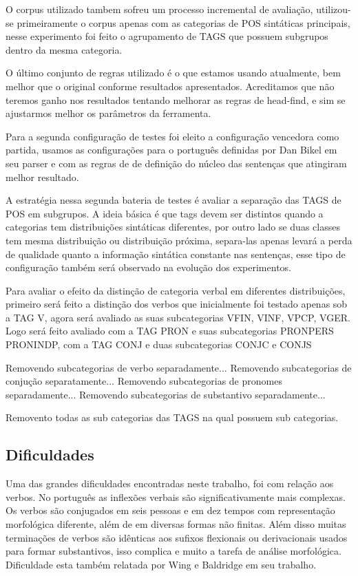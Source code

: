 O corpus utilizado tambem sofreu um processo incremental de avaliação, utilizou-se primeiramente o corpus apenas com as categorias de POS sintáticas principais, nesse experimento foi feito o agrupamento de TAGS que possuem subgrupos dentro da mesma categoria.

O último conjunto de regras utilizado é o que estamos usando atualmente, bem melhor que o original conforme resultados apresentados. Acreditamos que não teremos ganho nos resultados tentando melhorar as regras de head-find, e sim se ajustarmos melhor os parâmetros da ferramenta.

Para a segunda configuração de testes foi eleito a configuração vencedora como partida, usamos as configurações para o português definidas por Dan Bikel em seu parser e com as regras de de definição do núcleo das sentenças que atingiram melhor resultado.

A estratégia nessa segunda bateria de testes é avaliar a separação das TAGS de POS em subgrupos. A ideia básica é que tags devem ser distintos quando a categorias tem distribuições sintáticas diferentes, por outro lado se duas classes tem mesma distribuição ou distribuição próxima, separa-las apenas levará a perda de qualidade quanto a informação sintática constante nas sentenças, esse tipo de configuração também será observado na evolução dos experimentos.

Para avaliar o efeito da distinção de categoria verbal em diferentes distribuições, primeiro será feito a distinção dos verbos que inicialmente foi testado apenas sob a TAG V, agora será avaliado as suas subcategorias VFIN, VINF, VPCP, VGER. Logo será feito avaliado com a TAG PRON e suas subcategorias PRONPERS PRONINDP, com a TAG CONJ e duas subcategorias CONJC e CONJS 


Removendo subcategorias de verbo separadamente...
Removendo subcategorias de conjução separatamente...
Removendo subcategorias de pronomes separadamente...
Removendo subcategorias de substantivo separadamente...

Removento todas as sub categorias das TAGS na qual possuem sub categorias. 

\subsection{Dificuldades}
\label{sec:dificuldades}

Uma das grandes dificuldades encontradas neste trabalho, foi com relação aos verbos. No português as inflexões verbais são significativamente mais complexas. Os verbos são conjugados em seis pessoas e em dez tempos com representação morfológica diferente, além de em diversas formas não finitas. Além disso muitas terminações de verbos são idênticas aos sufixos flexionais ou derivacionais usados para formar substantivos, isso complica e muito a tarefa de análise morfológica. Dificuldade esta também relatada por Wing e Baldridge em seu trabalho.

